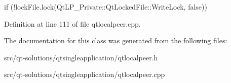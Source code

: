 if (!lockFile.lock(QtLP\_\-Private::QtLockedFile::WriteLock, false)) 



Definition at line 111 of file qtlocalpeer.cpp.



The documentation for this class was generated from the following files:\begin{DoxyCompactItemize}
\item 
src/qt-\/solutions/qtsingleapplication/qtlocalpeer.h\item 
src/qt-\/solutions/qtsingleapplication/qtlocalpeer.cpp\end{DoxyCompactItemize}
